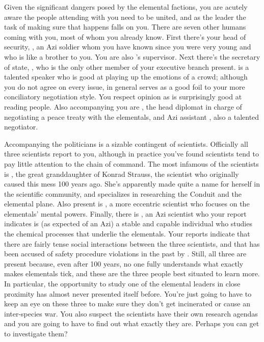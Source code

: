 \documentclass[char]{elementals}
\begin{document}
Given the significant dangers posed by the elemental factions, you are acutely aware the people attending with you need to be united, and as the leader the task of making sure that happens falls on you. There are seven other humans coming with you, most of whom you already know. First there's your head of security, \cRomeo{\intro}, an Azi soldier whom you have known since you were very young and who is like a brother to you. You are also \cRomeo{}'s supervisor. Next there's the secretary of state, \cDema{\intro}, who is the only other member of your executive branch present. \cDema{\They} is a talented speaker who is good at playing up the emotions of a crowd; although you do not agree on every issue, in general \cDema{\they} serves as a good foil to your more conciliatory negotiation style. You respect \cDema{\their} opinion as \cDema{\they} is surprisingly good at reading people. Also accompanying you are \cAvatar{\intro}, the head diplomat in charge of negotiating a peace treaty with the elementals, and \cAvatar{\their} Azi assistant \cDiplomat{\intro}, also a talented negotiator.

Accompanying the politicians is a sizable contingent of scientists. Officially all three scientists report to you, although in practice you've found scientists tend to pay little attention to the chain of command. The most infamous of the scientists is \cGD{\intro}, the great granddaughter of Konrad Strauss, the scientist who originally caused this mess 100 years ago. She's apparently made quite a name for herself in the scientific community, and specializes in researching the Conduit and the elemental plane. Also present is \cMS{\intro}, a more eccentric scientist who focuses on the elementals' mental powers. Finally, there is \cScientist{\intro}, an Azi scientist who your report indicates is (as expected of an Azi) a stable and capable individual who studies the chemical processes that underlie the elementals. Your reports indicate that there are fairly tense social interactions between the three scientists, and that \cMS{} has been accused of safety procedure violations in the past by \cScientist{}. Still, all three are present because, even after 100 years, no one fully understands what exactly makes elementals tick, and these are the three people best situated to learn more. In particular, the opportunity to study one of the elemental leaders in close proximity has almost never presented itself before. You're just going to have to keep an eye on these three to make sure they don't get incinerated or cause an inter-species war. You also suspect the scientists have their own research agendas and you are going to have to find out what exactly they are. Perhaps you can get \cRomeo{} to investigate them?
\end{document}
